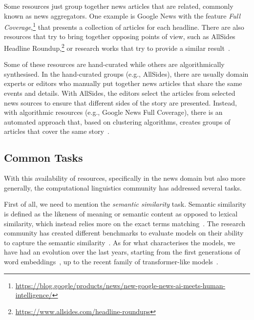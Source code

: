 Some resources just group together news articles that are related, commonly known as news aggregators.
One example is Google News with the feature \emph{Full Coverage},\footnote{\url{https://blog.google/products/news/new-google-news-ai-meets-human-intelligence/}} that presents a collection of articles for each headline.
There are also resources that try to bring together opposing points of view, such as AllSides Headline Roundup,\footnote{\url{https://www.allsides.com/headline-roundups}} or research works that try to provide a similar result~\citep{trampuvs2015diversinews,park2009newscube}.



Some of these resources are hand-curated while others are algorithmically synthesised. In the hand-curated groups (e.g., AllSides), there are usually domain experts or editors who manually put together news articles that share the same events and details. With AllSides, the editors select the articles from selected news sources to ensure that different sides of the story are presented.
Instead, with algorithmic resources (e.g., Google News Full Coverage), there is an automated approach that, based on clustering algorithms, creates groups of articles that cover the same story~\citep{marutho2018determination,alelyani2018feature,karimi2018news}.

\subsection{\statusgreen Common Tasks}
\label{ssec:lit_relationships_tasks}

With this availability of resources, specifically in the news domain but also more generally, the computational linguistics community has addressed several tasks.

First of all, we need to mention the \textit{semantic similarity} task.
Semantic similarity is defined as the likeness of meaning or semantic content as opposed to lexical similarity, which instead relies more on the exact terms matching~\citep{harispe2015semantic}.
The research community has created different benchmarks to evaluate models on their ability to capture the semantic similarity~\citep{conneau-kiela-2018-senteval,chandrasekaran2021evolution}.
As for what characterises the models, we have had an evolution over the last years, starting from the first generations of word embeddings~\citep{pennington2014glove,mikolov2013efficient}, up to the recent family of transformer-like models~\citep{devlin2018bert,cer2018universal,yang2019xlnet,reimers2019sentence}.

